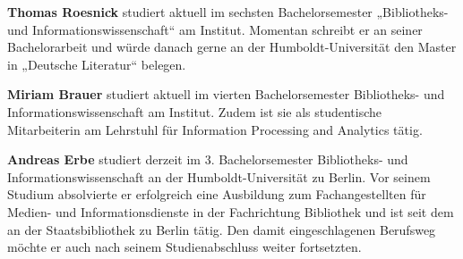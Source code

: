 \documentclass[a4paper,
fontsize=11pt,
oneside,
numbers=noperiodatend,
parskip=half-,
bibliography=totoc,
final
]{scrartcl}
\begin{document}
\textbf{Thomas Roesnick} studiert aktuell im sechsten Bachelorsemester
„Bibliotheks- und Informationswissenschaft`` am Institut. Momentan
schreibt er an seiner Bachelorarbeit und würde danach gerne an der
Humboldt-Universität den Master in „Deutsche Literatur`` belegen.

\textbf{Miriam Brauer} studiert aktuell im vierten Bachelorsemester
Bibliotheks- und Informationswissenschaft am Institut. Zudem ist sie als
studentische Mitarbeiterin am Lehrstuhl für Information Processing and
Analytics tätig.

\textbf{Andreas Erbe} studiert derzeit im 3. Bachelorsemester
Bibliotheks- und Informationswissenschaft an der Humboldt-Universität zu
Berlin. Vor seinem Studium absolvierte er erfolgreich eine Ausbildung
zum Fachangestellten für Medien- und Informationsdienste in der
Fachrichtung Bibliothek und ist seit dem an der Staatsbibliothek zu
Berlin tätig. Den damit eingeschlagenen Berufsweg möchte er auch nach
seinem Studienabschluss weiter fortsetzten.
\end{document}
